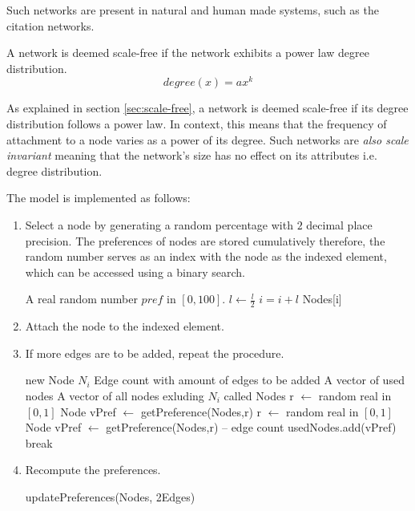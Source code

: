 \documentclass[a4paper,11pt,titlepage]{article}
\begin{document}
Such networks are present in natural and human made systems, such as the
citation networks.

A network is deemed scale-free if the network exhibits a power law degree
distribution.
\[
degree(x) = ax^k
 \]

As explained in section \ref{sec:scale-free}, a network is deemed scale-free if
its degree distribution follows a power law. In context, this means that the
frequency of attachment to a node varies as a power of its degree. Such networks
are \emph{also scale invariant} meaning that the network's size has no effect on
its attributes i.e. degree distribution.

The model is implemented as follows:
\begin{enumerate}
\item
  Select a node by generating a random percentage with $2$ decimal place
  precision. The preferences of nodes are stored cumulatively therefore, the
  random number serves as an index with the node as the indexed element, which
  can be accessed using a binary search.
  \begin{algorithmic}
    \REQUIRE A real random number $pref$ in $[0,100]$.
	      \STATE $l \gets \frac{l}{2}$
		\STATE $i = i+l$
		\ENDIF
	\ENDIF
	\ENDFOR
\ENDFOR
\RETURN Nodes[i]
\end{algorithmic}
  \item Attach the node to the indexed element.
  \item If more edges are to be added, repeat the procedure.

\begin{algorithmic}
\REQUIRE  new Node $N_i$
\REQUIRE Edge count with amount of edges to be added
\REQUIRE A vector of used nodes
\REQUIRE A vector of all nodes exluding $N_i$ called Nodes
	\STATE r $\gets$ random real in $[0, 1]$
	\STATE Node vPref $\gets$ getPreference(Nodes,r)
		\STATE r $\gets$ random real in $[0, 1]$
		\STATE Node vPref $\gets$ getPreference(Nodes,r)
	\ENDWHILE
	\STATE -- edge count
	\STATE usedNodes.add(vPref)
		\STATE break
	\ENDIF
\ENDWHILE

\end{algorithmic}
  \item Recompute the preferences.
\begin{algorithmic}
	\STATE updatePreferences(Nodes, 2Edges)
\end{algorithmic}
\end{enumerate}
\end{document}
